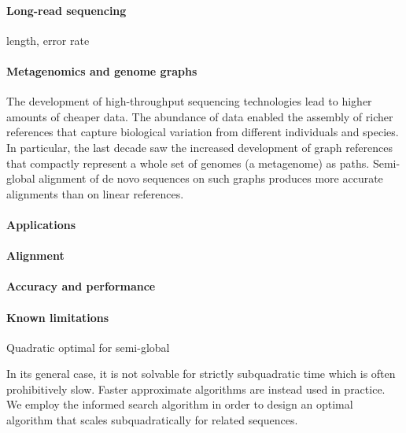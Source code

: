 \paragraph{Long-read sequencing}
length, error rate

\paragraph{Metagenomics and genome graphs}
The development of high-throughput sequencing technologies lead to higher
amounts of cheaper data. The abundance of data enabled the assembly of richer
references that capture biological variation from different individuals and
species. In particular, the last decade saw the increased development of graph
references that compactly represent a whole set of genomes (a metagenome) as
paths. Semi-global alignment of de novo sequences on such graphs produces more
accurate alignments than on linear references.

\paragraph{Applications}

\paragraph{Alignment}

\paragraph{Accuracy and performance}

\paragraph{Known limitations}

Quadratic optimal for semi-global

In its general case, it is not solvable for strictly subquadratic time which is
often prohibitively slow. Faster approximate algorithms are instead used in
practice. We employ the \A informed search algorithm in order to design an
optimal algorithm that scales subquadratically for related sequences.
